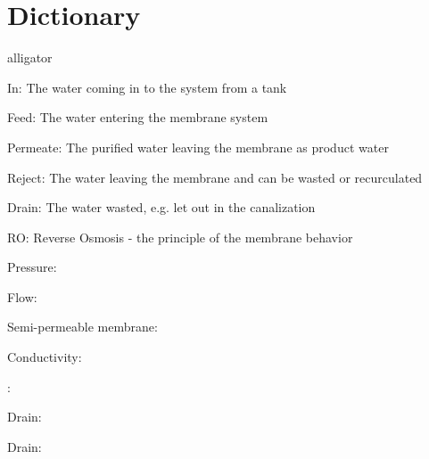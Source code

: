 

\section*{Dictionary}


\begin{labeling}{alligator}
\renewcommand\labelitemi{ }
\item [In:] The water coming in to the system from a tank
\item [Feed:] The water entering the membrane system
\item [Permeate:]  The purified water leaving the membrane as product water
\item [Reject:] The water leaving the membrane and can be wasted or recurculated
\item [Drain:] The water wasted, e.g. let out in the canalization
\item [RO:] Reverse Osmosis - the principle of the membrane behavior
\item [Pressure:] 
\item [Flow:]
\item [Semi-permeable membrane:]
\item [Conductivity:]
\item [:]
\item [Drain:]
\item [Drain:]



\end{labeling}



